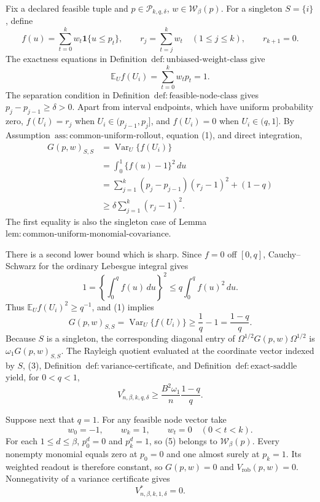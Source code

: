 Fix a declared feasible tuple and \(p\in\mathcal P_{k,q,\delta}\), \(w\in\mathcal W_\beta(p)\).  For a singleton \(S=\{i\}\), define
\[
f(u)=\sum_{t=0}^k w_t\mathbf 1\{u\le p_t\},
\qquad
r_j=\sum_{t=j}^k w_t\quad(1\le j\le k),
\qquad r_{k+1}=0.
\]
The exactness equations in Definition~\(\mathrm{def{:}unbiased\text{-}weight\text{-}class}\) give
\[
\mathbb E_U f(U_i)=\sum_{t=0}^k w_tp_t=1.
\tag{1}
\]
The separation condition in Definition~\(\mathrm{def{:}feasible\text{-}node\text{-}class}\) gives \(p_j-p_{j-1}\ge\delta>0\).  Apart from interval endpoints, which have uniform probability zero, \(f(U_i)=r_j\) when \(U_i\in(p_{j-1},p_j]\), and \(f(U_i)=0\) when \(U_i\in(q,1]\).  By Assumption~\(\mathrm{ass{:}common\text{-}uniform\text{-}rollout}\), equation (1), and direct integration,
\[
\begin{aligned}
G(p,w)_{S,S}
&=\operatorname{Var}_U\{f(U_i)\}\\
&=\int_0^1\{f(u)-1\}^2\,du\\
&=\sum_{j=1}^k(p_j-p_{j-1})(r_j-1)^2+(1-q)\\
&\ge \delta\sum_{j=1}^k(r_j-1)^2.
\end{aligned}
\tag{2}
\]
The first equality is also the singleton case of Lemma~\(\mathrm{lem{:}common\text{-}uniform\text{-}monomial\text{-}covariance}\).

There is a second lower bound which is sharp.  Since \(f=0\) off \([0,q]\), Cauchy--Schwarz for the ordinary Lebesgue integral gives
\[
1=\left\{\int_0^q f(u)\,du\right\}^2
\le q\int_0^q f(u)^2\,du.
\]
Thus \(\mathbb E_U f(U_i)^2\ge q^{-1}\), and (1) implies
\[
G(p,w)_{S,S}=\operatorname{Var}_U\{f(U_i)\}
\ge \frac1q-1=\frac{1-q}{q}.
\tag{3}
\]
Because \(S\) is a singleton, the corresponding diagonal entry of \(\Omega^{1/2}G(p,w)\Omega^{1/2}\) is \(\omega_1G(p,w)_{S,S}\).  The Rayleigh quotient evaluated at the coordinate vector indexed by \(S\), (3), Definition~\(\mathrm{def{:}variance\text{-}certificate}\), and Definition~\(\mathrm{def{:}exact\text{-}saddle}\) yield, for \(0<q<1\),
\[
V^*_{n,\beta,k,q,\delta}
\ge \frac{B^2\omega_1}{n}\frac{1-q}{q}.
\tag{4}
\]

Suppose next that \(q=1\).  For any feasible node vector take
\[
w_0=-1,\qquad w_k=1,\qquad w_t=0\quad(0<t<k).
\tag{5}
\]
For each \(1\le d\le\beta\), \(p_0^d=0\) and \(p_k^d=1\), so (5) belongs to \(\mathcal W_\beta(p)\).  Every nonempty monomial equals zero at \(p_0=0\) and one almost surely at \(p_k=1\).  Its weighted readout is therefore constant, so \(G(p,w)=0\) and \(V_{\mathrm{rob}}(p,w)=0\).  Nonnegativity of a variance certificate gives
\[
V^*_{n,\beta,k,1,\delta}=0.
\tag{6}
\]

